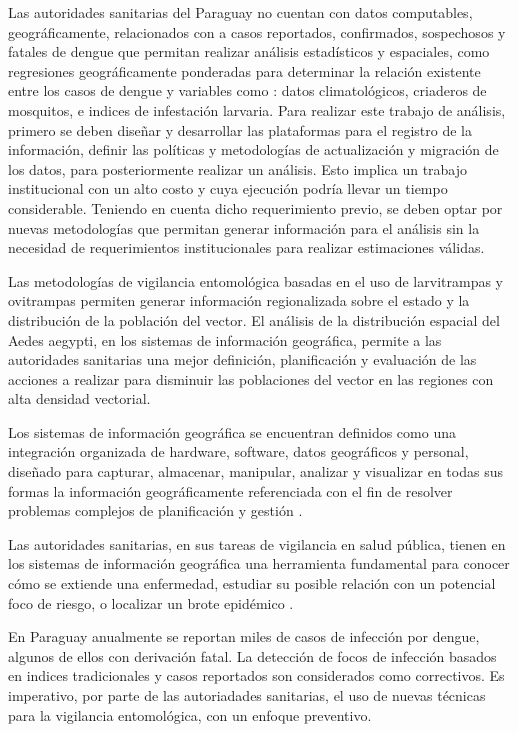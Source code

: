 Las autoridades sanitarias del Paraguay no cuentan con datos computables, geográficamente,
relacionados con a casos reportados, confirmados, sospechosos y fatales de dengue que permitan
realizar análisis estadísticos y espaciales, como regresiones geográficamente ponderadas para
determinar la relación existente entre los casos de dengue y variables como : datos
climatológicos, criaderos de mosquitos, e indices de infestación larvaria. Para realizar este
trabajo de análisis, primero se deben diseñar y desarrollar las plataformas para el registro de la
información, definir las políticas y metodologías de actualización y migración de los
datos, para posteriormente realizar un análisis. Esto implica un trabajo institucional con un
alto costo y cuya ejecución podría llevar un tiempo considerable. Teniendo en cuenta dicho
requerimiento previo, se deben optar por nuevas metodologías que permitan generar información para
el análisis sin la necesidad de requerimientos institucionales para realizar estimaciones válidas.

Las metodologías de vigilancia entomológica basadas en el uso de larvitrampas y ovitrampas
permiten generar información regionalizada sobre el estado y la distribución de la población del
vector. El análisis de la distribución espacial del Aedes aegypti, en los sistemas de información
geográfica, permite a las autoridades sanitarias una mejor definición, planificación y evaluación
de las acciones a realizar para disminuir las poblaciones del vector en las regiones con alta
densidad vectorial.

Los sistemas de información geográfica se encuentran definidos como una integración organizada de
hardware, software, datos geográficos y personal, diseñado para capturar, almacenar, manipular,
analizar y visualizar en todas sus formas la información geográficamente referenciada con el fin
de resolver problemas complejos de planificación y gestión \citep{lopezMarcos2007}.

Las autoridades sanitarias, en sus tareas de vigilancia en salud pública, tienen en los sistemas
de información geográfica una herramienta fundamental para conocer cómo se extiende una
enfermedad, estudiar su posible relación con un potencial foco de riesgo, o localizar un brote
epidémico \cite{vgomesAegis2001}.

En Paraguay anualmente se reportan miles de casos de infección por dengue, algunos de ellos con
derivación fatal. La detección de focos de infección basados en indices tradicionales y casos
reportados son considerados como correctivos. Es imperativo, por parte de las autoriadades
sanitarias, el uso de nuevas técnicas para la vigilancia entomológica, con un enfoque preventivo.

